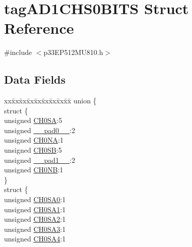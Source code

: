 \hypertarget{structtag_a_d1_c_h_s0_b_i_t_s}{}\section{tag\+A\+D1\+C\+H\+S0\+B\+I\+TS Struct Reference}
\label{structtag_a_d1_c_h_s0_b_i_t_s}


{\ttfamily \#include $<$p33\+E\+P512\+M\+U810.\+h$>$}

\subsection*{Data Fields}
\begin{DoxyCompactItemize}
\item 
\begin{tabbing}
xx\=xx\=xx\=xx\=xx\=xx\=xx\=xx\=xx\=\kill
union \{\\
\>struct \{\\
\>\>unsigned \hyperlink{structtag_a_d1_c_h_s0_b_i_t_s_a02d06e75304627f3824dd70952f074d2}{CH0SA}:5\\
\>\>unsigned \hyperlink{structtag_a_d1_c_h_s0_b_i_t_s_adf71f3d8410c1f1dbbc96680a92c49af}{\_\_pad0\_\_}:2\\
\>\>unsigned \hyperlink{structtag_a_d1_c_h_s0_b_i_t_s_a5db650d0700caff6850dc47668e109ff}{CH0NA}:1\\
\>\>unsigned \hyperlink{structtag_a_d1_c_h_s0_b_i_t_s_a66d2ac9bba669ad194278b166cd6776a}{CH0SB}:5\\
\>\>unsigned \hyperlink{structtag_a_d1_c_h_s0_b_i_t_s_acaf2d0924a107ec6e8d2e31febaf66f9}{\_\_pad1\_\_}:2\\
\>\>unsigned \hyperlink{structtag_a_d1_c_h_s0_b_i_t_s_a0e89c6ef104a8cf903cc3fdc309c713c}{CH0NB}:1\\
\>\} \\
\>struct \{\\
\>\>unsigned \hyperlink{structtag_a_d1_c_h_s0_b_i_t_s_ad040e21f24497077491384226832e0f1}{CH0SA0}:1\\
\>\>unsigned \hyperlink{structtag_a_d1_c_h_s0_b_i_t_s_ac68dfa77744e3c55bbce068060289cd3}{CH0SA1}:1\\
\>\>unsigned \hyperlink{structtag_a_d1_c_h_s0_b_i_t_s_a0f9fa73ca9c5a78bcfa34160502080c1}{CH0SA2}:1\\
\>\>unsigned \hyperlink{structtag_a_d1_c_h_s0_b_i_t_s_a8ec5af4a17cf0003bf829ecc1fb900d2}{CH0SA3}:1\\
\>\>unsigned \hyperlink{structtag_a_d1_c_h_s0_b_i_t_s_af5d1b2f598350f956576b87bddac3433}{CH0SA4}:1\\

\end{tabbing}
\end{DoxyCompactItemize}
